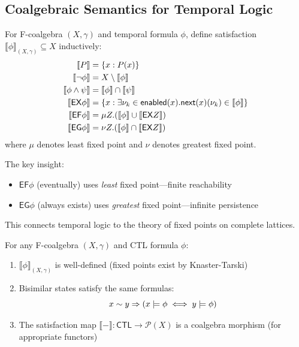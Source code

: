 \subsection{Coalgebraic Semantics for Temporal Logic}
\label{subsec:coalg-temporal-semantics}

\begin{definition}
\label{def:coalg-satisfaction}
For F-coalgebra $(X, \gamma)$ and temporal formula $\phi$, define satisfaction
$\llbracket \phi \rrbracket_{(X,\gamma)} \subseteq X$ inductively:
\begin{align*}
  \llbracket P \rrbracket &= \{x : P(x)\} \\
  \llbracket \neg\phi \rrbracket &= X \setminus \llbracket \phi \rrbracket \\
  \llbracket \phi \land \psi \rrbracket &= \llbracket \phi \rrbracket \cap \llbracket \psi \rrbracket \\
  \llbracket \mathsf{EX}\phi \rrbracket &= \{x : \exists \nu_{k} \in \mathsf{enabled}(x). \mathsf{next}(x)(\nu_{k}) \in \llbracket \phi \rrbracket\} \\
  \llbracket \mathsf{EF}\phi \rrbracket &= \mu Z. (\llbracket \phi \rrbracket \cup \llbracket \mathsf{EX}Z \rrbracket) \\
  \llbracket \mathsf{EG}\phi \rrbracket &= \nu Z. (\llbracket \phi \rrbracket \cap \llbracket \mathsf{EX}Z \rrbracket)
\end{align*}
where $\mu$ denotes least fixed point and $\nu$ denotes greatest fixed point.
\end{definition}

\begin{remark}
\label{rem:fixed-points-temporal}
The key insight:
\begin{itemize}
  \item $\mathsf{EF}\phi$ (eventually) uses \emph{least} fixed point---finite reachability
  \item $\mathsf{EG}\phi$ (always exists) uses \emph{greatest} fixed point---infinite persistence
\end{itemize}
This connects temporal logic to the theory of fixed points on complete lattices.
\end{remark}

\begin{theorem}
\label{thm:coalg-temporal-semantics}
For any F-coalgebra $(X, \gamma)$ and CTL formula $\phi$:
\begin{enumerate}[label=(\alph*)]
  \item $\llbracket \phi \rrbracket_{(X,\gamma)}$ is well-defined (fixed points exist by Knaster-Tarski)
  \item Bisimilar states satisfy the same formulas:
        \[
          x \sim y \Rightarrow (x \models \phi \iff y \models \phi)
        \]
  \item The satisfaction map $\llbracket - \rrbracket : \mathsf{CTL} \to \mathcal{P}(X)$
        is a coalgebra morphism (for appropriate functors)
\end{enumerate}
\end{theorem}


